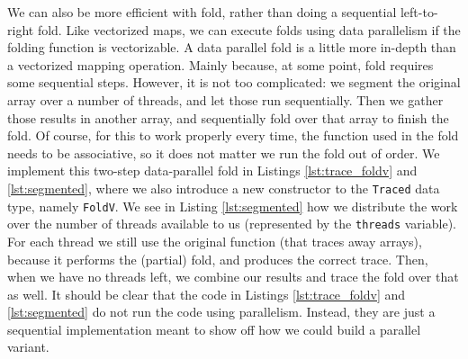         We can also be more efficient with fold, rather than doing a sequential left-to-right fold.
        Like vectorized maps, we can execute folds using data parallelism if the folding function is vectorizable.
        A data parallel fold is a little more in-depth than a vectorized mapping operation.
        Mainly because, at some point, fold requires some sequential steps.
        However, it is not too complicated: we segment the original array over a number of threads, and let those run sequentially.
        Then we gather those results in another array, and sequentially fold over that array to finish the fold.
        Of course, for this to work properly every time, the function used in the fold needs to be associative, so it does not matter we run the fold out of order.
        We implement this two-step data-parallel fold in Listings \ref{lst:trace_foldv} and \ref{lst:segmented}, where we also introduce a new constructor to the \texttt{Traced} data type, namely \texttt{FoldV}.
        We see in Listing \ref{lst:segmented} how we distribute the work over the number of threads available to us (represented by the \texttt{threads} variable).
        For each thread we still use the original function (that traces away arrays), because it performs the (partial) fold, and produces the correct trace.
        Then, when we have no threads left, we combine our results and trace the fold over that as well.
        It should be clear that the code in Listings \ref{lst:trace_foldv} and \ref{lst:segmented} do not run the code using parallelism.
        Instead, they are just a sequential implementation meant to show off how we could build a parallel variant.

